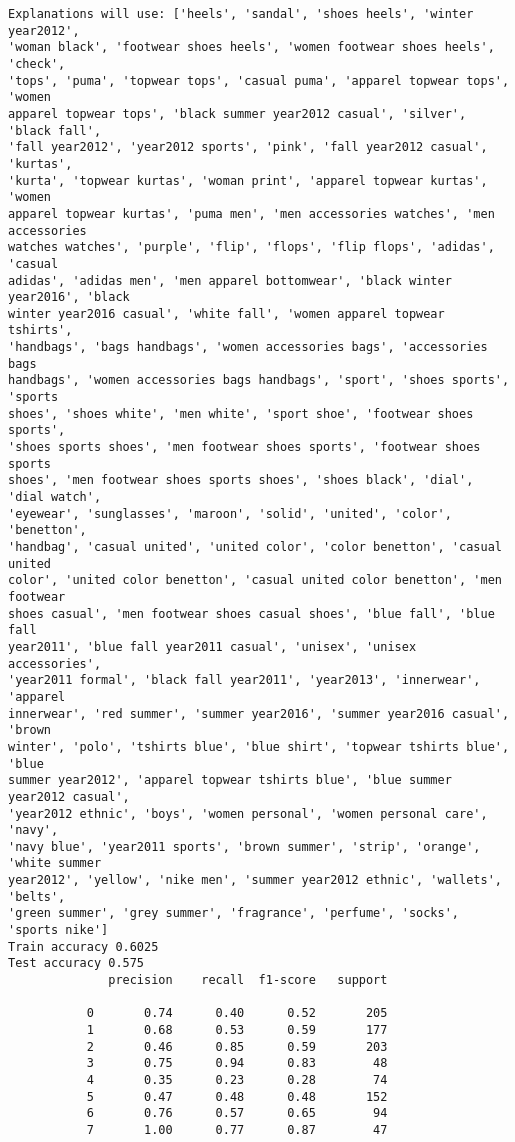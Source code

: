 \documentclass[11pt]{article}
\begin{document}
    \begin{Verbatim}[commandchars=\\\{\}]
Explanations will use: ['heels', 'sandal', 'shoes heels', 'winter year2012',
'woman black', 'footwear shoes heels', 'women footwear shoes heels', 'check',
'tops', 'puma', 'topwear tops', 'casual puma', 'apparel topwear tops', 'women
apparel topwear tops', 'black summer year2012 casual', 'silver', 'black fall',
'fall year2012', 'year2012 sports', 'pink', 'fall year2012 casual', 'kurtas',
'kurta', 'topwear kurtas', 'woman print', 'apparel topwear kurtas', 'women
apparel topwear kurtas', 'puma men', 'men accessories watches', 'men accessories
watches watches', 'purple', 'flip', 'flops', 'flip flops', 'adidas', 'casual
adidas', 'adidas men', 'men apparel bottomwear', 'black winter year2016', 'black
winter year2016 casual', 'white fall', 'women apparel topwear tshirts',
'handbags', 'bags handbags', 'women accessories bags', 'accessories bags
handbags', 'women accessories bags handbags', 'sport', 'shoes sports', 'sports
shoes', 'shoes white', 'men white', 'sport shoe', 'footwear shoes sports',
'shoes sports shoes', 'men footwear shoes sports', 'footwear shoes sports
shoes', 'men footwear shoes sports shoes', 'shoes black', 'dial', 'dial watch',
'eyewear', 'sunglasses', 'maroon', 'solid', 'united', 'color', 'benetton',
'handbag', 'casual united', 'united color', 'color benetton', 'casual united
color', 'united color benetton', 'casual united color benetton', 'men footwear
shoes casual', 'men footwear shoes casual shoes', 'blue fall', 'blue fall
year2011', 'blue fall year2011 casual', 'unisex', 'unisex accessories',
'year2011 formal', 'black fall year2011', 'year2013', 'innerwear', 'apparel
innerwear', 'red summer', 'summer year2016', 'summer year2016 casual', 'brown
winter', 'polo', 'tshirts blue', 'blue shirt', 'topwear tshirts blue', 'blue
summer year2012', 'apparel topwear tshirts blue', 'blue summer year2012 casual',
'year2012 ethnic', 'boys', 'women personal', 'women personal care', 'navy',
'navy blue', 'year2011 sports', 'brown summer', 'strip', 'orange', 'white summer
year2012', 'yellow', 'nike men', 'summer year2012 ethnic', 'wallets', 'belts',
'green summer', 'grey summer', 'fragrance', 'perfume', 'socks', 'sports nike']
Train accuracy 0.6025
Test accuracy 0.575
              precision    recall  f1-score   support

           0       0.74      0.40      0.52       205
           1       0.68      0.53      0.59       177
           2       0.46      0.85      0.59       203
           3       0.75      0.94      0.83        48
           4       0.35      0.23      0.28        74
           5       0.47      0.48      0.48       152
           6       0.76      0.57      0.65        94
           7       1.00      0.77      0.87        47


\end{Verbatim}
\end{document}
